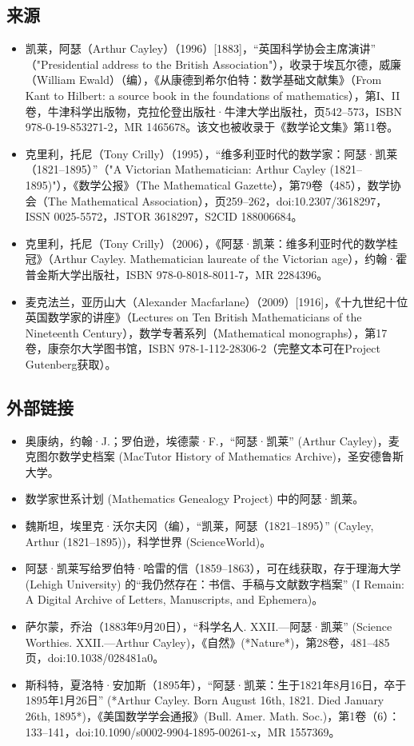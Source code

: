 \subsection{来源} 
\begin{itemize}
\item 凯莱，阿瑟（Arthur Cayley）（1996）[1883]，“英国科学协会主席演讲” （"Presidential address to the British Association"），收录于埃瓦尔德，威廉（William Ewald）（编），《从康德到希尔伯特：数学基础文献集》（From Kant to Hilbert: a source book in the foundations of mathematics），第I、II卷，牛津科学出版物，克拉伦登出版社·牛津大学出版社，页542–573，ISBN 978-0-19-853271-2，MR 1465678。该文也被收录于《数学论文集》第11卷。  
\item 克里利，托尼（Tony Crilly）（1995），“维多利亚时代的数学家：阿瑟·凯莱（1821–1895）”（"A Victorian Mathematician: Arthur Cayley (1821–1895)"），《数学公报》（The Mathematical Gazette），第79卷（485），数学协会（The Mathematical Association），页259–262，doi:10.2307/3618297，ISSN 0025-5572，JSTOR 3618297，S2CID 188006684。  
\item 克里利，托尼（Tony Crilly）（2006），《阿瑟·凯莱：维多利亚时代的数学桂冠》（Arthur Cayley. Mathematician laureate of the Victorian age），约翰·霍普金斯大学出版社，ISBN 978-0-8018-8011-7，MR 2284396。  
\item 麦克法兰，亚历山大（Alexander Macfarlane）（2009）[1916]，《十九世纪十位英国数学家的讲座》（Lectures on Ten British Mathematicians of the Nineteenth Century），数学专著系列（Mathematical monographs），第17卷，康奈尔大学图书馆，ISBN 978-1-112-28306-2（完整文本可在Project Gutenberg获取）。  
\end{itemize}
\subsection{外部链接}
\begin{itemize}
\item 奥康纳，约翰·J.；罗伯逊，埃德蒙·F.，“阿瑟·凯莱” (Arthur Cayley)，麦克图尔数学史档案 (MacTutor History of Mathematics Archive)，圣安德鲁斯大学。  
\item 数学家世系计划 (Mathematics Genealogy Project) 中的阿瑟·凯莱。  
\item 魏斯坦，埃里克·沃尔夫冈（编），“凯莱，阿瑟（1821–1895）” (Cayley, Arthur (1821–1895))，科学世界 (ScienceWorld)。  
\item 阿瑟·凯莱写给罗伯特·哈雷的信（1859–1863），可在线获取，存于理海大学 (Lehigh University) 的“我仍然存在：书信、手稿与文献数字档案” (I Remain: A Digital Archive of Letters, Manuscripts, and Ephemera)。  
\item 萨尔蒙，乔治（1883年9月20日），“科学名人. XXII.—阿瑟·凯莱” (Science Worthies. XXII.—Arthur Cayley)，《自然》(*Nature*)，第28卷，481–485页，doi:10.1038/028481a0。  
\item 斯科特，夏洛特·安加斯（1895年），“阿瑟·凯莱：生于1821年8月16日，卒于1895年1月26日” (*Arthur Cayley. Born August 16th, 1821. Died January 26th, 1895*)，《美国数学学会通报》(Bull. Amer. Math. Soc.)，第1卷（6）：133–141，doi:10.1090/s0002-9904-1895-00261-x，MR 1557369。  
\end{itemize}